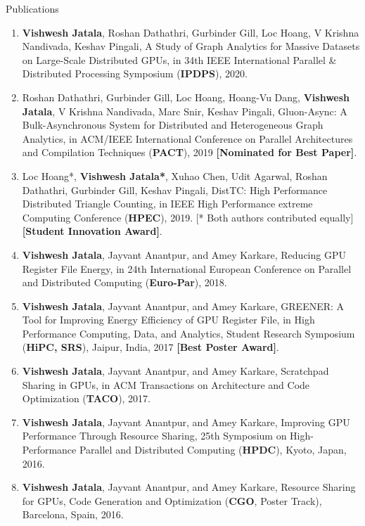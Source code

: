 \documentclass{resume} %
\begin{document}
\begin{rSection}{Publications}
\begin{enumerate}
\item \textbf{Vishwesh Jatala}, Roshan Dathathri, Gurbinder Gill, Loc Hoang, V Krishna Nandivada, Keshav Pingali, A Study of Graph Analytics for Massive Datasets on Large-Scale Distributed GPUs, in 34th IEEE International Parallel \& Distributed Processing Symposium (\textbf{IPDPS}), 2020. %
\item Roshan Dathathri, Gurbinder Gill, Loc Hoang, Hoang-Vu Dang, \textbf{Vishwesh Jatala}, V Krishna Nandivada, Marc Snir, Keshav Pingali, Gluon-Async: A Bulk-Asynchronous System for Distributed and Heterogeneous Graph Analytics, in ACM/IEEE International Conference on Parallel Architectures and Compilation Techniques (\textbf{PACT}), 2019 \textbf{[Nominated for Best Paper]}.
\item Loc Hoang*, \textbf{Vishwesh Jatala*}, Xuhao Chen, Udit Agarwal, Roshan Dathathri, Gurbinder Gill, Keshav Pingali, DistTC: High Performance Distributed Triangle Counting, in IEEE High Performance extreme Computing Conference (\textbf{HPEC}), 2019.  [* Both authors contributed equally] \textbf{[Student Innovation Award]}.
\item \textbf{Vishwesh Jatala}, Jayvant Anantpur, and Amey Karkare, Reducing GPU Register File Energy, in 24th International European Conference on Parallel and Distributed Computing (\textbf{Euro-Par}), 2018. 
\item \textbf{Vishwesh Jatala}, Jayvant Anantpur, and Amey Karkare, GREENER: A Tool for Improving Energy Efficiency of GPU Register File, in High Performance Computing, Data, and Analytics, Student Research Symposium (\textbf{HiPC, SRS}), Jaipur, India, 2017 \textbf{[Best Poster Award]}. 
\item \textbf{Vishwesh Jatala}, Jayvant Anantpur, and Amey Karkare, Scratchpad Sharing in GPUs, in ACM Transactions on Architecture and Code Optimization (\textbf{TACO}), 2017. 
\item \textbf{Vishwesh Jatala}, Jayvant Anantpur, and Amey Karkare, Improving GPU Performance Through Resource Sharing, 25th Symposium on High-Performance Parallel and Distributed Computing (\textbf{HPDC}), Kyoto, Japan, 2016.
\item \textbf{Vishwesh Jatala}, Jayvant Anantpur, and Amey Karkare, Resource Sharing for GPUs, Code Generation and Optimization (\textbf{CGO}, Poster Track), Barcelona, Spain, 2016.
\end{enumerate}
\end{rSection}
\end{document}
